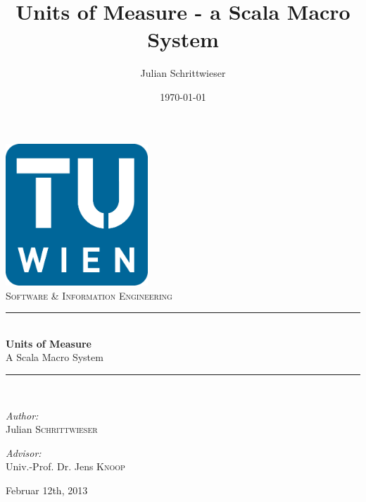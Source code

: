 \documentclass[12pt,oneside,a4paper]{scrbook}
\title{Units of Measure - a Scala Macro System}
\author{Julian Schrittwieser}
\date{\today}
\newcommand{\HRule}{\rule{\linewidth}{0.5mm}}
\begin{document}
\begin{titlepage}

\begin{center}


\includegraphics[width=0.4\textwidth]{tu-logo.png}\\[3cm]


\textsc{\Large Software \& Information Engineering}\\[0.5cm]


\HRule \\[0.8cm]
{ \huge \bfseries Units of Measure}\\[0.4cm]
\Large A Scala Macro System

\HRule \\[1.5cm]

\vfill


\begin{minipage}{0.4\textwidth}
\begin{flushleft} \large
\emph{Author:}\\
Julian \textsc{Schrittwieser}
\end{flushleft}
\end{minipage}
\begin{minipage}{0.4\textwidth}
\begin{flushright} \large
\emph{Advisor:} \\
Univ.-Prof. Dr. Jens \textsc{Knoop}
\end{flushright}
\end{minipage}

\vfill

{\large Februar 12th, 2013}

\end{center}

\end{titlepage}

\setcounter{page}{2}
\end{document}
